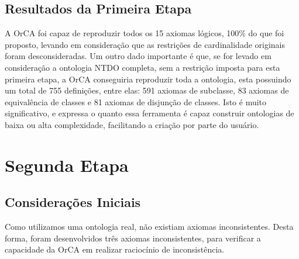 \documentclass{bcc}
\begin{document}

 



\subsection{Resultados da Primeira Etapa}

A OrCA foi capaz de reproduzir todos os 15 axiomas lógicos, 100\% do que foi proposto, levando em consideração que as restrições de cardinalidade originais foram desconsideradas. Um outro dado importante é que, se for levado em consideração a ontologia NTDO completa, sem a restrição imposta para esta primeira etapa, a OrCA conseguiria reproduzir toda a ontologia, esta possuindo um total de 755 definições, entre elas: 591 axiomas de subclasse, 83 axiomas de equivalência de classes e 81 axiomas de disjunção de classes. Isto é muito significativo, e expressa o quanto essa ferramenta é capaz construir ontologias de baixa ou alta complexidade, facilitando a criação por parte do usuário.

\section{Segunda Etapa}

\subsection{Considerações Iniciais}
Como utilizamos uma ontologia real, não existiam axiomas inconsistentes. Desta forma, foram desenvolvidos três axiomas inconsistentes, para verificar a capacidade da OrCA em realizar raciocínio de inconsistência. 
\end{document}
